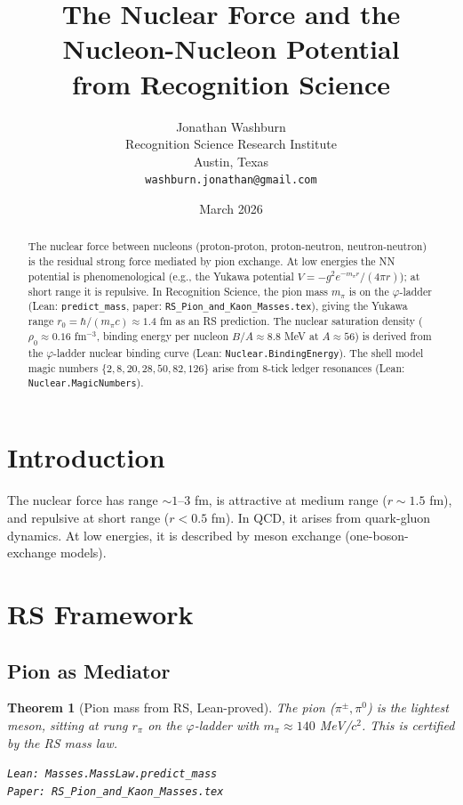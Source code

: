 \documentclass[12pt,a4paper]{article}
\title{The Nuclear Force and the Nucleon-Nucleon Potential\\
from Recognition Science}
\author{Jonathan Washburn\\
Recognition Science Research Institute\\
Austin, Texas\\
\texttt{washburn.jonathan@gmail.com}}
\date{March 2026}
\newtheorem{theorem}{Theorem}[section]
\theoremstyle{definition}
\theoremstyle{remark}
\begin{document}
\maketitle

\begin{abstract}
The nuclear force between nucleons (proton-proton, proton-neutron,
neutron-neutron) is the residual strong force mediated by pion exchange.
At low energies the NN potential is phenomenological (e.g., the
Yukawa potential $V = -g^2 e^{-m_\pi r}/(4\pi r)$); at short range it
is repulsive.  In Recognition Science, the pion mass $m_\pi$ is on the
$\varphi$-ladder (Lean: \texttt{predict\_mass}, paper:
\texttt{RS\_Pion\_and\_Kaon\_Masses.tex}), giving the Yukawa range
$r_0 = \hbar/(m_\pi c) \approx 1.4$ fm as an RS prediction.  The nuclear
saturation density ($\rho_0 \approx 0.16$ fm$^{-3}$, binding energy per
nucleon $B/A \approx 8.8$ MeV at $A \approx 56$) is derived from the
$\varphi$-ladder nuclear binding curve (Lean: \texttt{Nuclear.BindingEnergy}).
The shell model magic numbers $\{2,8,20,28,50,82,126\}$ arise from
8-tick ledger resonances (Lean: \texttt{Nuclear.MagicNumbers}).
\end{abstract}

\section{Introduction}

The nuclear force has range $\sim 1$--$3$ fm, is attractive at medium
range ($r \sim 1.5$ fm), and repulsive at short range ($r < 0.5$ fm).
In QCD, it arises from quark-gluon dynamics.  At low energies, it is
described by meson exchange (one-boson-exchange models).

\section{RS Framework}

\subsection{Pion as Mediator}

\begin{theorem}[Pion mass from RS, Lean-proved]\label{thm:pion}
The pion ($\pi^\pm, \pi^0$) is the lightest meson, sitting at rung
$r_\pi$ on the $\varphi$-ladder with $m_\pi \approx 140$ MeV/$c^2$.
This is certified by the RS mass law.

\texttt{Lean: Masses.MassLaw.predict\_mass}\\
\texttt{Paper: RS\_Pion\_and\_Kaon\_Masses.tex}
\end{theorem}
\end{document}
